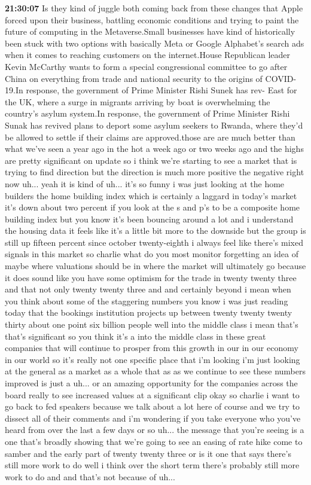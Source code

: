 \documentclass{article}%
\begin{document}
\textbf{21:30:07}%
\newline%
Is they kind of juggle both coming back from these changes that Apple forced upon their business, battling economic conditions and trying to paint the future of computing in the Metaverse.Small businesses have kind of historically been stuck with two options with basically Meta or Google Alphabet's search ads when it comes to reaching customers on the internet.House Republican leader Kevin McCarthy wants to form a special congressional committee to go after China on everything from trade and national security to the origins of COVID{-}19.In response, the government of Prime Minister Rishi Sunek has rev{-}  East for the UK, where a surge in migrants arriving by boat is overwhelming the country's asylum system.In response, the government of Prime Minister Rishi Sunak has revived plans to deport some asylum seekers to Rwanda, where they'd be allowed to settle if their claims are approved.those are are much better than what we've seen a year ago in the hot a week ago or two weeks ago and the highs are pretty significant on update so i think we're starting to see a market that is trying to find direction but the direction is much more positive the negative right now uh... yeah it is kind of uh... it's so funny i was just looking at the home builders the home building index which is certainly a laggard in today's market it's down about two percent if you look at the s and p's to be a composite home building index but you know it's been bouncing around a lot and i understand the housing data it feels like it's a little bit more to the downside but the group is still up fifteen percent since october twenty{-}eighth i always feel like there's mixed signals in this market so charlie what do you most monitor forgetting an idea of maybe where valuations should be in where the market will ultimately go because it does sound like you have some optimism for the trade in twenty twenty three and that not only twenty twenty three and and certainly beyond i mean when you think about some of the staggering numbers you know i was just reading today that the bookings institution projects up between twenty twenty twenty thirty about one point six billion people well into the middle class i mean that's that's significant so you think it's a into the middle class in these great companies that will continue to prosper from this growth in our in our economy in our world so it's really not one specific place that i'm looking i'm just looking at the general as a market as a whole that as as we continue to see these numbers improved is just a uh... or an amazing opportunity for the companies across the board really to see increased values at a significant clip okay so charlie i want to go back to fed speakers because we talk about a lot here of course and we try to dissect all of their comments and i'm wondering if you take everyone who you've heard from over the last a few days or so uh... the message that you're seeing is a one that's broadly showing that we're going to see an easing of rate hike come to samber and the early part of twenty twenty three or is it one that says there's still more work to do well i think over the short term there's probably still more work to do and and that's not because of uh... 
\end{document}

